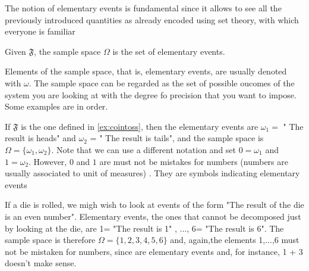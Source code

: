 The notion of elementary events is fundamental since it allows to see all the previously introduced quantities as already encoded using set theory, with which everyone is familiar 
\begin{definition}
	\label{d:sample_space}
	Given $\mathfrak F$, the sample space $\Omega$ is the set of elementary events. 
\end{definition}
Elements of the sample space, that is, elementary events, are usually denoted with $\omega$.  The sample space can be regarded as the set of possible oucomes of the system you are looking at with the degree fo precision that you want to impose. Some examples are in order. 

\begin{example}
	If $\mathfrak F$ is the one defined in \eqref{ex:cointoss}, then the elementary events are $\omega_1 =$ " The result is heads" and $\omega_2$ = " The result is tails", and the sample space is $\Omega = \{\omega_1, \omega_2\}$. Note that we can use a different notation and set $ 0 = \omega_1$ and $ 1 =\omega_2$. However, $0$ and $1$ are must not be mistakes for numbers (numbers are usually associated to unit of measures) . They are symbols indicating elementary events 

\end{example}

\begin{example}
		\label{ex:die_sample}
		If a die is rolled, we migh wish to look at events of the form "The result of the die is an even number". Elementary events, the ones that cannot be decomposed just by looking at the die, are 1= "The result is 1" , ..., 6= "The result is 6". The sample space is therefore $\Omega =\{1,2,3,4,5,6\}$ and, again,the elements 1,...,6 must not be mistaken for numbers, since are elementary events and, for instance, 1 + 3 doesn't make sense. 

\end{example}

